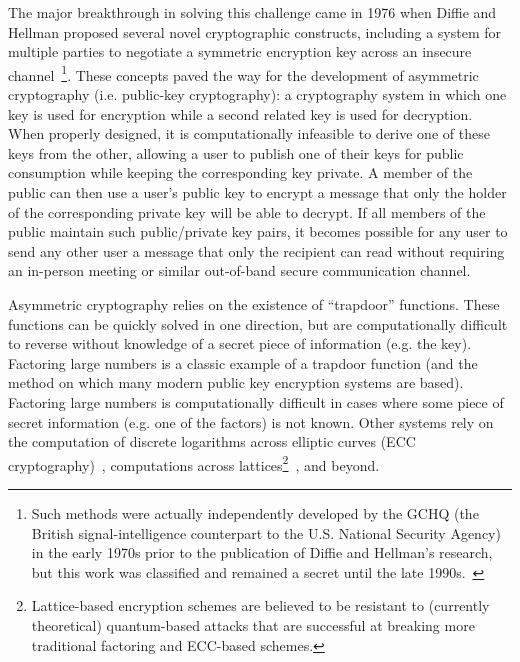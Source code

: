 The major breakthrough in solving this challenge came in 1976 when
Diffie and Hellman proposed several novel cryptographic constructs,
including a system for multiple parties to negotiate a symmetric
encryption key across an insecure
channel~\cite{diffie1976}\footnote{Such methods were actually
  independently developed by the GCHQ (the British signal-intelligence
  counterpart to the U.S. National Security Agency) in the early 1970s
  prior to the publication of Diffie and Hellman's research, but this
  work was classified and remained a secret until the late
  1990s.~\cite{singh1999}}. These concepts paved the way for the
development of asymmetric cryptography (i.e. public-key cryptography):
a cryptography system in which one key is used for encryption while a
second related key is used for decryption. When properly designed, it
is computationally infeasible to derive one of these keys from the
other, allowing a user to publish one of their keys for public
consumption while keeping the corresponding key private. A member of
the public can then use a user's public key to encrypt a message that
only the holder of the corresponding private key will be able to
decrypt. If all members of the public maintain such public/private key
pairs, it becomes possible for any user to send any other user a
message that only the recipient can read without requiring an
in-person meeting or similar out-of-band secure communication channel.

Asymmetric cryptography relies on the existence of ``trapdoor''
functions. These functions can be quickly solved in one direction, but
are computationally difficult to reverse without knowledge of a secret
piece of information (e.g. the key). Factoring large numbers is a
classic example of a trapdoor function (and the method on which many
modern public key encryption systems are based). Factoring large
numbers is computationally difficult in cases where some piece of
secret information (e.g. one of the factors) is not known. Other
systems rely on the computation of discrete logarithms across elliptic
curves (ECC cryptography)~\cite{koblitz1987, miller1986}, computations
across lattices\footnote{Lattice-based encryption schemes are believed
  to be resistant to (currently theoretical) quantum-based attacks
  that are successful at breaking more traditional factoring and
  ECC-based schemes.}~\cite{ajtai1996}, and beyond.

